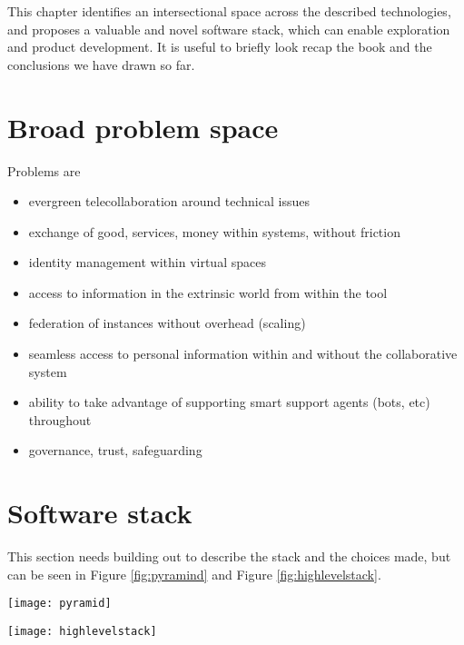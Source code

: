 This chapter identifies an intersectional space across the described technologies, and proposes a valuable and novel software stack, which can enable exploration  and product development. It is useful to briefly look recap the book and the conclusions we have drawn so far.



\section{Broad problem space}
Problems are
\begin{itemize}
\item evergreen telecollaboration around technical issues
\item exchange of good, services, money within systems, without friction
\item identity management within virtual spaces
\item access to information in the extrinsic world from within the tool
\item federation of instances without overhead (scaling)
\item seamless access to personal information within and without the collaborative system
\item ability to take advantage of supporting smart support agents (bots, etc) throughout
\item governance, trust, safeguarding
\end{itemize}

\section{Software stack}
This section needs building out to describe the stack and the choices made, but can be seen in Figure \ref{fig:pyramind} and Figure \ref{fig:highlevelstack}.

\begin{figure*}[ht]\centering 	\texttt{[image: pyramid]}
	\caption{Pyramid showing the components for sats, stablecoins on lightning, asssets, and trust}
	\label{fig:pyramind}
\end{figure*}

\begin{figure*}[ht]\centering 	\texttt{[image: highlevelstack]}
	\caption{High level overview showing the components for sats, stablecoins on lightning, asssets, and trust}
	\label{fig:highlevelstack}
\end{figure*}

